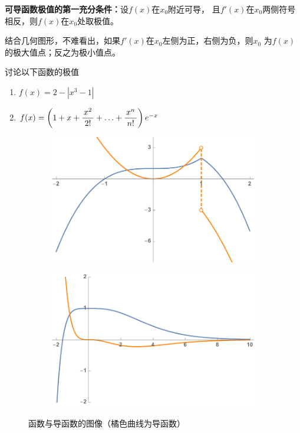 \begin{thx}
	{\bf 可导函数极值的第一充分条件：}设$f(x)$在$x_0$附近可导，
	且$f'(x)$在$x_0$两侧符号相反，则$f(x)$在$x_0$处取极值。
\end{thx}

结合几何图形，不难看出，如果$f'(x)$在$x_0$左侧为正，右侧为负，则$x_0$
为$f(x)$的极大值点；反之为极小值点。

\egz 讨论以下函数的极值
\begin{enumerate}[(1)]
  \setlength{\itemindent}{1cm}
  \item $f(x)=2-|x^3-1|$
  \item $f(x)=\left(1+x+\displaystyle\frac{\,{x^2}\,}{\,{2!}\,}+\ldots+\displaystyle\frac{\,{x^n}\,}{\,{n!}\,}\right)e^{-x}$ 
\end{enumerate}
	
\begin{figure}[h]
	\centering
	\begin{subfigure}[t]{0.45\textwidth}
		\centering
		\includegraphics[width=\textwidth]
		{./Images/Ch03/2absx31.pdf}
	\end{subfigure}\quad
	\begin{subfigure}[t]{0.45\textwidth}
		\centering
		\includegraphics[width=\textwidth]
		{./Images/Ch03/1xx2x3ex.pdf}
	\end{subfigure}
	\caption{函数与导函数的图像（橘色曲线为导函数）}
	\label{fig:fxdfx}
\end{figure}

